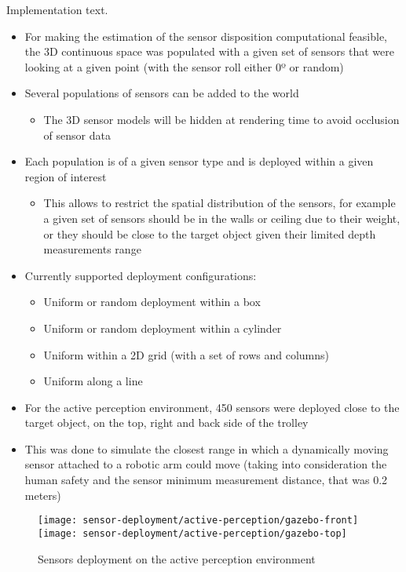 Implementation text.

\begin{itemize}
	\item For making the estimation of the sensor disposition computational feasible, the 3D continuous space was populated with a given set of sensors that were looking at a given point (with the sensor roll either 0º or random)
	\item Several populations of sensors can be added to the world
	\begin{itemize}
		\item The 3D sensor models will be hidden at rendering time to avoid occlusion of sensor data
	\end{itemize}
	\item Each population is of a given sensor type and is deployed within a given region of interest 
	\begin{itemize}
		\item This allows to restrict the spatial distribution of the sensors, for example a given set of sensors should be in the walls or ceiling due to their weight, or they should be close to the target object given their limited depth measurements range
	\end{itemize}
	\item Currently supported deployment configurations:
	\begin{itemize}
		\item Uniform or random deployment within a box
		\item Uniform or random deployment within a cylinder
		\item Uniform within a 2D grid (with a set of rows and columns)
		\item Uniform along a line
	\end{itemize}
\end{itemize}

\begin{itemize}
	\item For the active perception environment, 450 sensors were deployed close to the target object, on the top, right and back side of the trolley
	\item This was done to simulate the closest range in which a dynamically moving sensor attached to a robotic arm could move (taking into consideration the human safety and the sensor minimum measurement distance, that was 0.2 meters)
\end{itemize}
\begin{figure}
	\centering
	\texttt{[image: sensor-deployment/active-perception/gazebo-front]}\hspace{1em}
	\texttt{[image: sensor-deployment/active-perception/gazebo-top]}
	\caption{Sensors deployment on the active perception environment}
\end{figure}


